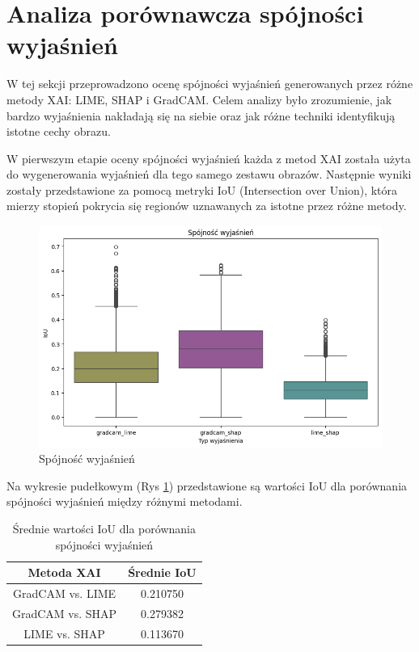 \section*{Analiza porównawcza spójności wyjaśnień}

W tej sekcji przeprowadzono ocenę spójności wyjaśnień generowanych przez różne metody XAI: LIME, SHAP i GradCAM.
Celem analizy było zrozumienie, jak bardzo wyjaśnienia nakładają się na siebie oraz jak różne techniki identyfikują istotne cechy obrazu.

W pierwszym etapie oceny spójności wyjaśnień każda z metod XAI została użyta do wygenerowania wyjaśnień dla tego samego zestawu obrazów.
Następnie wyniki zostały przedstawione za pomocą metryki IoU (Intersection over Union), która mierzy stopień pokrycia się regionów uznawanych za istotne przez różne metody.

\begin{figure}
	\centering\includegraphics[width=.6\textwidth]{img/base_coherence}
	\caption{Spójność wyjaśnień}  \label{rys:base_coherence}
\end{figure}

Na wykresie pudełkowym (Rys \ref{rys:base_coherence}) przedstawione są wartości IoU dla porównania spójności wyjaśnień między różnymi metodami.

\begin{table}
	\centering
	\begin{tabular}{|c|c|}
		\hline
		\textbf{Metoda XAI} & \textbf{Średnie IoU} \\
		\hline
		GradCAM vs. LIME    & 0.210750             \\
		\hline
		GradCAM vs. SHAP    & 0.279382             \\
		\hline
		LIME vs. SHAP       & 0.113670             \\
		\hline
	\end{tabular}
	\caption{Średnie wartości IoU dla porównania spójności wyjaśnień}
	\label{tab:base_coherence}
\end{table}


